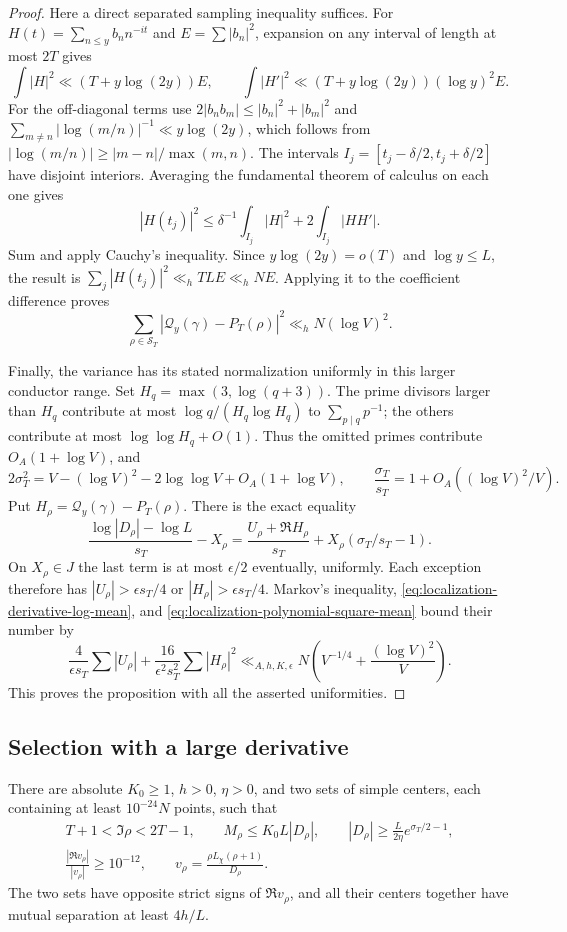 \begin{proof}
Here a direct separated sampling inequality suffices. For
$H(t)=\sum_{n\le y}b_nn^{-it}$ and $E=\sum|b_n|^2$,
expansion on any interval of length at most $2T$ gives
\[
 \int|H|^2\ll(T+y\log(2y))E,\qquad
 \int|H'|^2\ll(T+y\log(2y))(\log y)^2E.
\]
For the off-diagonal terms use
$2|b_nb_m|\le|b_n|^2+|b_m|^2$ and
$\sum_{m\ne n}|\log(m/n)|^{-1}\ll y\log(2y)$,
which follows from
$|\log(m/n)|\ge|m-n|/\max(m,n)$.
The intervals $I_j=[t_j-\delta/2,t_j+\delta/2]$ have disjoint
interiors. Averaging the fundamental theorem of calculus on each
one gives
\[
 |H(t_j)|^2\le\delta^{-1}\int_{I_j}|H|^2
                             +2\int_{I_j}|HH'|.
\]
Sum and apply Cauchy's inequality. Since $y\log(2y)=o(T)$ and
$\log y\le L$, the result is
$\sum_j|H(t_j)|^2\ll_h TLE\ll_h NE$.
Applying it to the coefficient difference proves
\begin{equation}\label{eq:localization-polynomial-square-mean}
 \sum_{\rho\in\mathcal S_T}
 |\mathcal Q_y(\gamma)-P_T(\rho)|^2\ll_hN(\log V)^2.
\end{equation}

Finally, the variance has its stated normalization uniformly in
this larger conductor range. Set $H_q=\max(3,\log(q+3))$.
The prime divisors larger than $H_q$ contribute at most
$\log q/(H_q\log H_q)$ to $\sum_{p\mid q}p^{-1}$;
the others contribute at most $\log\log H_q+O(1)$.
Thus the omitted primes contribute $O_A(1+\log V)$, and
\[
 2\sigma_T^2
 =V-(\log V)^2-2\log\log V+O_A(1+\log V),\qquad
 \frac{\sigma_T}{s_T}=1+O_A((\log V)^2/V).
\]
Put $H_\rho=\mathcal Q_y(\gamma)-P_T(\rho)$. There is the
exact equality
\[
 \frac{\log|D_\rho|-\log L}{s_T}-X_\rho
 =\frac{U_\rho+\Re H_\rho}{s_T}
              +X_\rho(\sigma_T/s_T-1).
\]
On $X_\rho\in J$ the last term is at most $\epsilon/2$ eventually,
uniformly. Each exception therefore has
$|U_\rho|>\epsilon s_T/4$ or $|H_\rho|>\epsilon s_T/4$.
Markov's inequality, \eqref{eq:localization-derivative-log-mean},
and \eqref{eq:localization-polynomial-square-mean} bound their number by
\[
 \frac4{\epsilon s_T}\sum|U_\rho|
 +\frac{16}{\epsilon^2s_T^2}\sum|H_\rho|^2
 \ll_{A,h,K,\epsilon}
 N\left(V^{-1/4}+\frac{(\log V)^2}{V}\right).
\]
This proves the proposition with all the asserted uniformities.
\end{proof}

\subsection{Selection with a large derivative}
\begin{lemma}\label{lem:large-derivative-selection}
There are absolute $K_0\ge1$, $h>0$, $\eta>0$, and two sets of
simple centers, each containing at least $10^{-24}N$ points, such that
\begin{gather*}
 T+1<\Im\rho<2T-1,\qquad
 M_\rho\le K_0L|D_\rho|,\qquad
 |D_\rho|\ge\frac L{2\eta}e^{\sigma_T/2-1},\\
 \frac{|\Re v_\rho|}{|v_\rho|}\ge10^{-12},\qquad
 v_\rho=\frac{\rho L_\chi(\rho+1)}{D_\rho}.
\end{gather*}
The two sets have opposite strict signs of $\Re v_\rho$, and all
their centers together have mutual separation at least $4h/L$.
\end{lemma}

